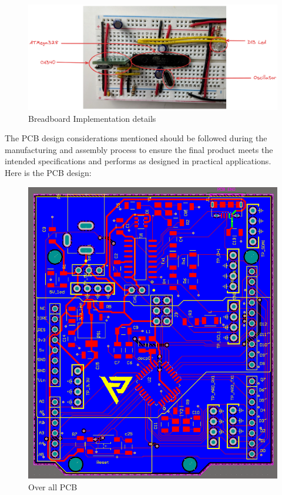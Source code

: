 \documentclass[a4paper,11pt]{article}%
\begin{document}
\begin{figure}[H]
	\centering
	\includegraphics[scale=0.25]{figures/breadboard_des.png}
	\caption{Breadboard Implementation details}
\end{figure}


The PCB design considerations mentioned should be followed during the manufacturing and assembly process to ensure the final product meets the intended specifications and performs as designed in practical applications.\\

Here is the PCB design:\\
\begin{figure}[H]
	\centering
	\includegraphics[scale=0.6]{figures/pcb/overall_pcb.png}
	\caption{Over all PCB}
	\label{top}
\end{figure}
\end{document}
